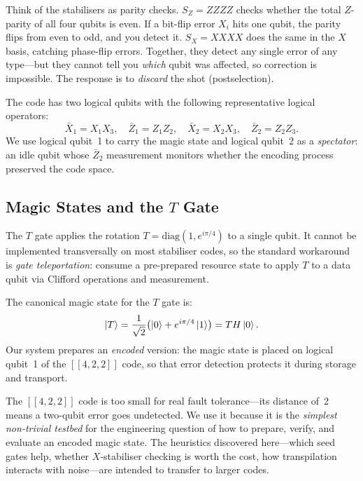 \documentclass[11pt,a4paper]{article}
\begin{document}
\begin{intuition}
Think of the stabilisers as parity checks. $S_Z = ZZZZ$ checks whether the
total $Z$-parity of all four qubits is even. If a bit-flip error $X_i$ hits
one qubit, the parity flips from even to odd, and you detect it. $S_X = XXXX$
does the same in the $X$ basis, catching phase-flip errors. Together, they
detect any single error of any type---but they cannot tell you \emph{which}
qubit was affected, so correction is impossible. The response is to
\emph{discard} the shot (postselection).
\end{intuition}

The code has two logical qubits with the following representative logical
operators:
\begin{equation}
  \bar{X}_1 = X_1 X_3, \quad
  \bar{Z}_1 = Z_1 Z_2, \quad
  \bar{X}_2 = X_2 X_3, \quad
  \bar{Z}_2 = Z_2 Z_3.
  \label{eq:logicals}
\end{equation}
We use logical qubit~1 to carry the magic state and logical qubit~2 as a
\emph{spectator}: an idle qubit whose $\bar{Z}_2$ measurement monitors
whether the encoding process preserved the code space.

\subsection{\texorpdfstring{Magic States and the $T$ Gate}{Magic States and the T Gate}}
\label{sec:magic}

The $T$ gate applies the rotation $T = \mathrm{diag}(1, e^{i\pi/4})$ to a
single qubit. It cannot be implemented transversally on most stabiliser codes,
so the standard workaround is \emph{gate teleportation}: consume a pre-prepared
resource state to apply $T$ to a data qubit via Clifford operations and
measurement.

The canonical magic state for the $T$ gate is:
\begin{equation}
  \ket{T} = \frac{1}{\sqrt{2}}\bigl(\ket{0} + e^{i\pi/4}\ket{1}\bigr)
           = T H \ket{0}.
  \label{eq:magic_state}
\end{equation}
Our system prepares an \emph{encoded} version: the magic state is placed on
logical qubit~1 of the $[\![4,2,2]\!]$ code, so that error detection protects
it during storage and transport.

\begin{warning}
The $[\![4,2,2]\!]$ code is too small for real fault tolerance---its distance
of~2 means a two-qubit error goes undetected. We use it because it is the
\emph{simplest non-trivial testbed} for the engineering question of how to
prepare, verify, and evaluate an encoded magic state. The heuristics
discovered here---which seed gates help, whether $X$-stabiliser checking is
worth the cost, how transpilation interacts with noise---are intended to
transfer to larger codes.
\end{warning}
\end{document}
